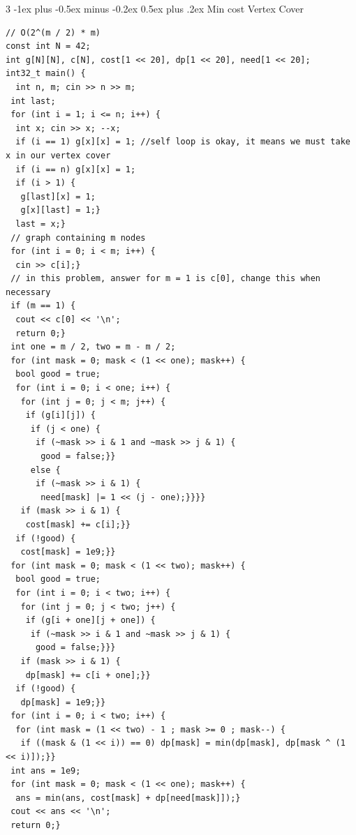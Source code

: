 \documentclass[8pt,a4paper,onesided]{article}
\makeatletter
\renewcommand{\subsection}{\@startsection{subsection}{2}{0mm}
    {-1ex plus -0.5ex minus -0.2ex} %
    {0.5ex plus .2ex}                %
    {\normalfont\large\bfseries}}    %
\makeatother
\begin{document}
\begin{multicols}{3}
\subsection{Min cost Vertex Cover}
\begin{verbatim}
// O(2^(m / 2) * m)
const int N = 42;
int g[N][N], c[N], cost[1 << 20], dp[1 << 20], need[1 << 20];
int32_t main() {
  int n, m; cin >> n >> m;
 int last;
 for (int i = 1; i <= n; i++) {
  int x; cin >> x; --x;
  if (i == 1) g[x][x] = 1; //self loop is okay, it means we must take x in our vertex cover
  if (i == n) g[x][x] = 1;
  if (i > 1) {
   g[last][x] = 1;
   g[x][last] = 1;}
  last = x;}
 // graph containing m nodes
 for (int i = 0; i < m; i++) {
  cin >> c[i];}
 // in this problem, answer for m = 1 is c[0], change this when necessary
 if (m == 1) {
  cout << c[0] << '\n';
  return 0;}
 int one = m / 2, two = m - m / 2;
 for (int mask = 0; mask < (1 << one); mask++) {
  bool good = true;
  for (int i = 0; i < one; i++) {
   for (int j = 0; j < m; j++) {
    if (g[i][j]) {
     if (j < one) {
      if (~mask >> i & 1 and ~mask >> j & 1) {
       good = false;}}
     else {
      if (~mask >> i & 1) {
       need[mask] |= 1 << (j - one);}}}}
   if (mask >> i & 1) {
    cost[mask] += c[i];}}
  if (!good) {
   cost[mask] = 1e9;}}
 for (int mask = 0; mask < (1 << two); mask++) {
  bool good = true;
  for (int i = 0; i < two; i++) {
   for (int j = 0; j < two; j++) {
    if (g[i + one][j + one]) {
     if (~mask >> i & 1 and ~mask >> j & 1) {
      good = false;}}}
   if (mask >> i & 1) {
    dp[mask] += c[i + one];}}
  if (!good) {
   dp[mask] = 1e9;}}
 for (int i = 0; i < two; i++) {
  for (int mask = (1 << two) - 1 ; mask >= 0 ; mask--) {
   if ((mask & (1 << i)) == 0) dp[mask] = min(dp[mask], dp[mask ^ (1 << i)]);}}
 int ans = 1e9;
 for (int mask = 0; mask < (1 << one); mask++) {
  ans = min(ans, cost[mask] + dp[need[mask]]);}
 cout << ans << '\n';
 return 0;}\end{verbatim}

\end{multicols}
\end{document}
